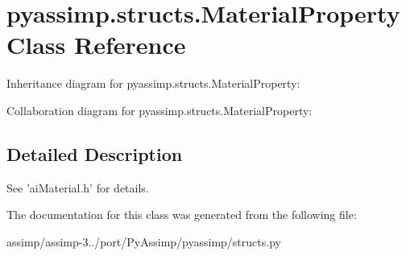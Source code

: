 \hypertarget{classpyassimp_1_1structs_1_1_material_property}{\section{pyassimp.\+structs.\+Material\+Property Class Reference}
\label{classpyassimp_1_1structs_1_1_material_property}
}


Inheritance diagram for pyassimp.\+structs.\+Material\+Property\+:


Collaboration diagram for pyassimp.\+structs.\+Material\+Property\+:


\subsection{Detailed Description}
\begin{DoxyVerb}See 'aiMaterial.h' for details.
\end{DoxyVerb}
 

The documentation for this class was generated from the following file\+:\begin{DoxyCompactItemize}
\item 
assimp/assimp-\/3../port/\+Py\+Assimp/pyassimp/structs.\+py\end{DoxyCompactItemize}
